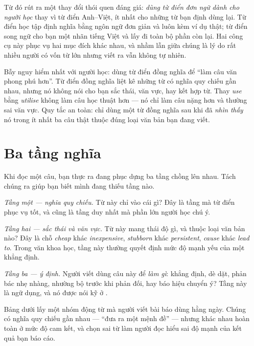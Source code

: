 \documentclass[../../english.tex]{subfiles}
\begin{document}
Từ đó rút ra một thay đổi thói quen đáng giá: \emph{dùng từ điển đơn ngữ dành cho người học} thay vì từ điển Anh--Việt, ít nhất cho những từ bạn định dùng lại. Từ điển học tập định nghĩa bằng ngôn ngữ đơn giản và luôn kèm ví dụ thật; từ điển song ngữ cho bạn một nhãn tiếng Việt và lấy đi toàn bộ phần còn lại. Hai công cụ này phục vụ hai mục đích khác nhau, và nhầm lẫn giữa chúng là lý do rất nhiều người có vốn từ lớn nhưng viết ra vẫn không tự nhiên.

\begin{cambay}
Bẫy nguy hiểm nhất với người học: dùng từ điển đồng nghĩa để ``làm câu văn phong phú hơn''. Từ điển đồng nghĩa liệt kê những từ có nghĩa quy chiếu gần nhau, nhưng nó không nói cho bạn sắc thái, văn vực, hay kết hợp từ. Thay \emph{use} bằng \emph{utilise} không làm câu học thuật hơn --- nó chỉ làm câu nặng hơn và thường sai văn vực. Quy tắc an toàn: chỉ dùng một từ đồng nghĩa sau khi đã \emph{nhìn thấy} nó trong ít nhất ba câu thật thuộc đúng loại văn bản bạn đang viết.
\end{cambay}

\section{Ba tầng nghĩa}

Khi đọc một câu, bạn thực ra đang phục dựng ba tầng chồng lên nhau. Tách chúng ra giúp bạn biết mình đang thiếu tầng nào.

\emph{Tầng một --- nghĩa quy chiếu.} Từ này chỉ vào cái gì? Đây là tầng mà từ điển phục vụ tốt, và cũng là tầng duy nhất mà phần lớn người học chú ý.

\emph{Tầng hai --- sắc thái và văn vực.} Từ này mang thái độ gì, và thuộc loại văn bản nào? Đây là chỗ \emph{cheap} khác \emph{inexpensive}, \emph{stubborn} khác \emph{persistent}, \emph{cause} khác \emph{lead to}. Trong văn khoa học, tầng này thường quyết định mức độ mạnh yếu của một khẳng định.

\emph{Tầng ba --- ý định.} Người viết dùng câu này để \emph{làm gì}: khẳng định, dè dặt, phản bác nhẹ nhàng, nhường bộ trước khi phản đối, hay báo hiệu chuyển ý? Tầng này là ngữ dụng, và nó được nói kỹ ở .

Bảng dưới lấy một nhóm động từ mà người viết bài báo dùng hằng ngày. Chúng có nghĩa quy chiếu gần nhau --- ``đưa ra một mệnh đề'' --- nhưng khác nhau hoàn toàn ở mức độ cam kết, và chọn sai từ làm người đọc hiểu sai độ mạnh của kết quả bạn báo cáo.
\end{document}
